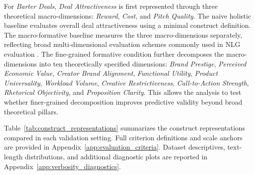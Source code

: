 For \textit{Barter Deals}, \textit{Deal Attractiveness} is first represented through three theoretical macro-dimensions: \textit{Reward}, \textit{Cost}, and \textit{Pitch Quality}. The naive holistic baseline evaluates overall deal attractiveness using a minimal construct definition. The macro-formative baseline measures the three macro-dimensions separately, reflecting broad multi-dimensional evaluation schemes commonly used in NLG evaluation \citep{fabbri_summeval_2021, liu_g-eval_2023, zhongUnifiedMultiDimensionalEvaluator2022a}. The fine-grained formative condition further decomposes the macro-dimensions into ten theoretically specified dimensions: \textit{Brand Prestige}, \textit{Perceived Economic Value}, \textit{Creator Brand Alignment}, \textit{Functional Utility}, \textit{Product Universality}, \textit{Workload Volume}, \textit{Creative Restrictiveness}, \textit{Call-to-Action Strength}, \textit{Rhetorical Objectivity}, and \textit{Proposition Clarity}. This allows the analysis to test whether finer-grained decomposition improves predictive validity beyond broad theoretical pillars.

Table~\ref{tab:construct_representations} summarizes the construct representations compared in each validation setting. Full criterion definitions and scale anchors are provided in Appendix~\ref{app:evaluation_criteria}. Dataset descriptives, text-length distributions, and additional diagnostic plots are reported in Appendix~\ref{app:verbosity_diagnostics}.

